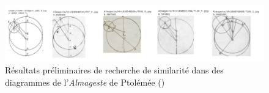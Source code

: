 \begin{figure}[h]
	\centering
	\includegraphics[width=16cm]{images/eida_similarity.png}
	\caption{Résultats préliminaires de recherche de similarité dans des diagrammes de l'\textit{Almageste} de Ptolémée (\eida)}
	\label{fig:eida_similarity}
\end{figure}
